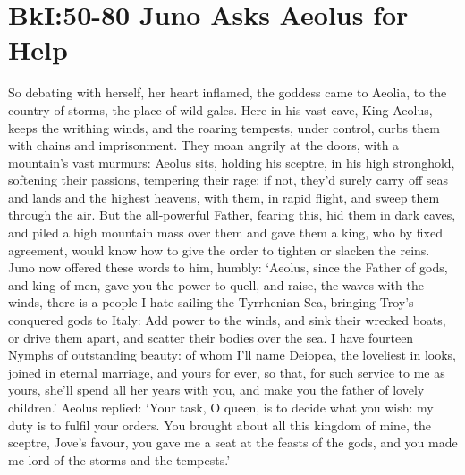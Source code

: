\documentclass[12pt, usletter]{article}
\begin{document}
\section*{BkI:50-80 Juno Asks Aeolus for Help}
So debating with herself, her heart inflamed, the goddess
came to Aeolia, to the country of storms, the place
of wild gales. Here in his vast cave, King Aeolus,
keeps the writhing winds, and the roaring tempests,
under control, curbs them with chains and imprisonment.
They moan angrily at the doors, with a mountain’s vast murmurs:
Aeolus sits, holding his sceptre, in his high stronghold,
softening their passions, tempering their rage: if not,
they’d surely carry off seas and lands and the highest heavens,
with them, in rapid flight, and sweep them through the air.
But the all-powerful Father, fearing this, hid them
in dark caves, and piled a high mountain mass over them
and gave them a king, who by fixed agreement, would know
how to give the order to tighten or slacken the reins.
Juno now offered these words to him, humbly:
‘Aeolus, since the Father of gods, and king of men,
gave you the power to quell, and raise, the waves with the winds,
there is a people I hate sailing the Tyrrhenian Sea,
bringing Troy’s conquered gods to Italy:
Add power to the winds, and sink their wrecked boats,
or drive them apart, and scatter their bodies over the sea.
I have fourteen Nymphs of outstanding beauty:
of whom I’ll name Deiopea, the loveliest in looks,
joined in eternal marriage, and yours for ever, so that,
for such service to me as yours, she’ll spend all her years
with you, and make you the father of lovely children.’
Aeolus replied: ‘Your task, O queen, is to decide
what you wish: my duty is to fulfil your orders.
You brought about all this kingdom of mine, the sceptre,
Jove’s favour, you gave me a seat at the feasts of the gods,
and you made me lord of the storms and the tempests.’
\end{document}
